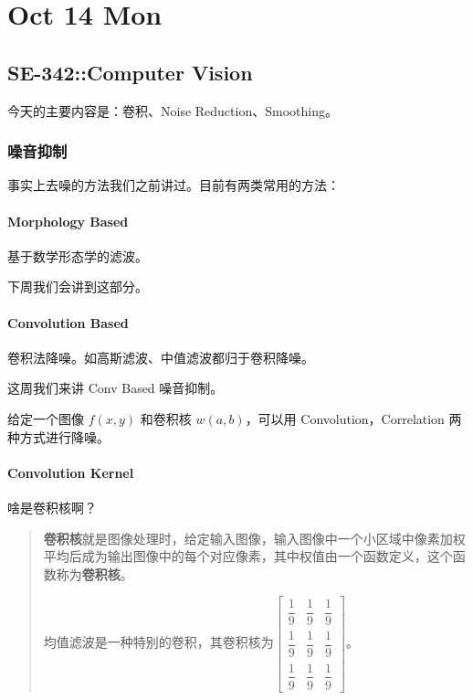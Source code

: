 \documentclass[
]{article}
\date{}
\begin{document}
\hypertarget{header-n0}{%
\section{Oct 14 Mon}\label{header-n0}}

\hypertarget{header-n2}{%
\subsection{SE-342::Computer Vision}\label{header-n2}}

今天的主要内容是：卷积、Noise Reduction、Smoothing。

\hypertarget{header-n4}{%
\subsubsection{噪音抑制}\label{header-n4}}

事实上去噪的方法我们之前讲过。目前有两类常用的方法：

\hypertarget{header-n6}{%
\paragraph{Morphology Based}\label{header-n6}}

基于数学形态学的滤波。

下周我们会讲到这部分。

\hypertarget{header-n9}{%
\paragraph{Convolution Based}\label{header-n9}}

卷积法降噪。如高斯滤波、中值滤波都归于卷积降噪。

这周我们来讲 Conv Based 噪音抑制。

给定一个图像 \(f(x, y)\) 和卷积核 \(w(a, b)\)，可以用
Convolution，Correlation 两种方式进行降噪。

\hypertarget{header-n13}{%
\paragraph{Convolution Kernel}\label{header-n13}}

啥是卷积核啊？

\begin{quote}
\textbf{卷积核}就是图像处理时，给定输入图像，输入图像中一个小区域中像素加权平均后成为输出图像中的每个对应像素，其中权值由一个函数定义，这个函数称为\textbf{卷积核}。

均值滤波是一种特别的卷积，其卷积核为\( \left[ \begin{matrix}   \dfrac 1 9 & \dfrac 1 9 & \dfrac 1 9 \\   \dfrac 1 9 & \dfrac 1 9 & \dfrac 1 9 \\   \dfrac 1 9 & \dfrac 1 9 & \dfrac 1 9\end{matrix}  \right]  \)。
\end{quote}
\end{document}
